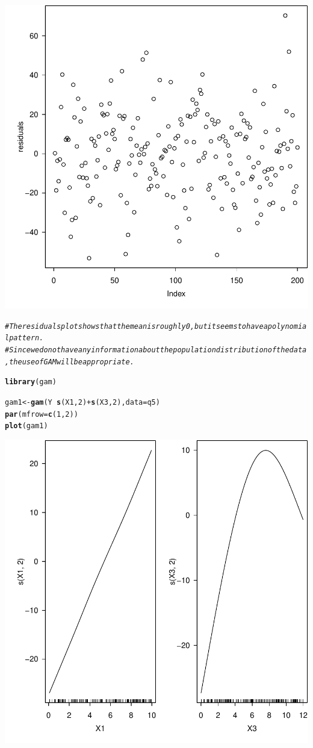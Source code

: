 \documentclass{article}\usepackage[]{graphicx}\usepackage[]{color}
\makeatletter
\newcommand{\hlnum}[1]{\textcolor[rgb]{0.686,0.059,0.569}{#1}}%
\newcommand{\hlcom}[1]{\textcolor[rgb]{0.678,0.584,0.686}{\textit{#1}}}%
\newcommand{\hlopt}[1]{\textcolor[rgb]{0,0,0}{#1}}%
\newcommand{\hlstd}[1]{\textcolor[rgb]{0.345,0.345,0.345}{#1}}%
\newcommand{\hlkwb}[1]{\textcolor[rgb]{0.69,0.353,0.396}{#1}}%
\newcommand{\hlkwc}[1]{\textcolor[rgb]{0.333,0.667,0.333}{#1}}%
\newcommand{\hlkwd}[1]{\textcolor[rgb]{0.737,0.353,0.396}{\textbf{#1}}}%
\newenvironment{kframe}{%
 \def\at@end@of@kframe{}%
 \ifinner\ifhmode%
  \def\at@end@of@kframe{\end{minipage}}%
  \begin{minipage}{\columnwidth}%
 \fi\fi%
 \def\FrameCommand##1{\hskip\@totalleftmargin \hskip-\fboxsep
 \colorbox{shadecolor}{##1}\hskip-\fboxsep
     \hskip-\linewidth \hskip-\@totalleftmargin \hskip\columnwidth}%
 \MakeFramed {\advance\hsize-\width
   \@totalleftmargin\z@ \linewidth\hsize
   \@setminipage}}%
 {\par\unskip\endMakeFramed%
 \at@end@of@kframe}
\newenvironment{knitrout}{}{} %
\makeatother
\begin{document}
\begin{knitrout}
{\centering \includegraphics[width=.6\linewidth]{figure/r-codes-for-hw1-Rnwunnamed-chunk-2-1} 

}


\begin{kframe}\begin{alltt}
\hlcom{#The residuals plot shows that the mean is roughly 0, but it seems to have a polynomial pattern.}
\hlcom{#Since we do not have any information about the population distribution of the data, the use of GAM will be appropriate.}

\hlkwd{library}\hlstd{(gam)}
\end{alltt}


{\ttfamily\noindent\itshape\color{messagecolor}{\#\# Loading required package: splines}}

{\ttfamily\noindent\itshape\color{messagecolor}{\#\# Loading required package: foreach}}

{\ttfamily\noindent\itshape\color{messagecolor}{\#\# Loaded gam 1.20}}\begin{alltt}
\hlstd{gam1} \hlkwb{<-} \hlkwd{gam}\hlstd{(Y} \hlopt{~} \hlkwd{s}\hlstd{(X1,}\hlnum{2}\hlstd{)} \hlopt{+} \hlkwd{s}\hlstd{(X3,}\hlnum{2}\hlstd{),} \hlkwc{data} \hlstd{= q5)}
\hlkwd{par}\hlstd{(}\hlkwc{mfrow}\hlstd{=}\hlkwd{c}\hlstd{(}\hlnum{1}\hlstd{,}\hlnum{2}\hlstd{))}
\hlkwd{plot}\hlstd{(gam1)}
\end{alltt}
\end{kframe}

{\centering \includegraphics[width=.6\linewidth]{figure/r-codes-for-hw1-Rnwunnamed-chunk-2-2} 

}
\end{knitrout}
\end{document}
